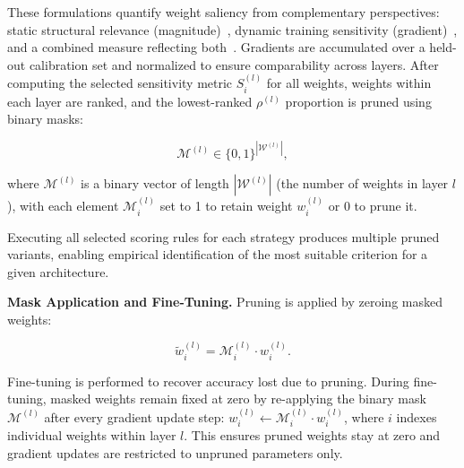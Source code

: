 \documentclass[11pt, conference]{IEEEtran}
\begin{document}
These formulations quantify weight saliency from complementary perspectives: static structural relevance (magnitude)~\cite{han2015learning}, dynamic training sensitivity (gradient)~\cite{lee2018snip}, and a combined measure reflecting both~\cite{wang2020picking}. Gradients are accumulated over a held-out calibration set and normalized to ensure comparability across layers. After computing the selected sensitivity metric $S_i^{(l)}$ for all weights, weights within each layer are ranked, and the lowest-ranked $\rho^{(l)}$ proportion is pruned using binary masks:

\begin{equation}
\mathcal{M}^{(l)} \in \{0,1\}^{|\mathcal{W}^{(l)}|},
\end{equation}

where $\mathcal{M}^{(l)}$ is a binary vector of length $|\mathcal{W}^{(l)}|$ (the number of weights in layer $l$), with each element $\mathcal{M}_i^{(l)}$ set to 1 to retain weight $w_i^{(l)}$ or 0 to prune it.

Executing all selected scoring rules for each strategy produces multiple pruned variants, enabling empirical identification of the most suitable criterion for a given architecture.

\textbf{Mask Application and Fine-Tuning.}
Pruning is applied by zeroing masked weights:

\begin{equation}
\tilde{w}_i^{(l)} = \mathcal{M}_i^{(l)} \cdot w_i^{(l)}.
\end{equation}

Fine-tuning is performed to recover accuracy lost due to pruning. During fine-tuning, masked weights remain fixed at zero by re-applying the binary mask $\mathcal{M}^{(l)}$ after every gradient update step: $w_i^{(l)} \leftarrow \mathcal{M}_i^{(l)} \cdot w_i^{(l)}$, where $i$ indexes individual weights within layer $l$. This ensures pruned weights stay at zero and gradient updates are restricted to unpruned parameters only.




\end{document}
